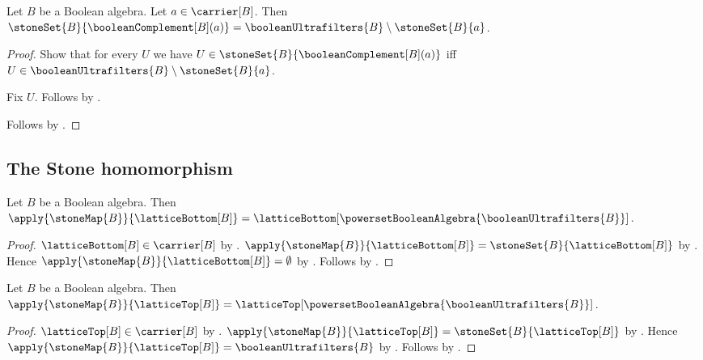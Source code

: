 \begin{proposition}\label{stone_set_complement}
    Let $B$ be a Boolean algebra.
    Let $a\in\carrier[B]$.
    Then $\stoneSet{B}{\booleanComplement[B](a)}=
        \booleanUltrafilters{B}\setminus\stoneSet{B}{a}$.
\end{proposition}
\begin{proof}
    Show that for every $U$ we have
        $U\in\stoneSet{B}{\booleanComplement[B](a)}$ iff
        $U\in\booleanUltrafilters{B}\setminus\stoneSet{B}{a}$.
    \begin{subproof}
        Fix $U$.
        Follows by
            .
    \end{subproof}
    Follows by .
\end{proof}

\subsection{The Stone homomorphism}

\begin{proposition}\label{stone_map_lattice_bottom}
    Let $B$ be a Boolean algebra.
    Then $\apply{\stoneMap{B}}{\latticeBottom[B]}=
        \latticeBottom[\powersetBooleanAlgebra{\booleanUltrafilters{B}}]$.
\end{proposition}
\begin{proof}
    $\latticeBottom[B]\in\carrier[B]$ by
        .
    $\apply{\stoneMap{B}}{\latticeBottom[B]}=
        \stoneSet{B}{\latticeBottom[B]}$ by .
    Hence $\apply{\stoneMap{B}}{\latticeBottom[B]}=\emptyset$ by
        .
    Follows by .
\end{proof}

\begin{proposition}\label{stone_map_lattice_top}
    Let $B$ be a Boolean algebra.
    Then $\apply{\stoneMap{B}}{\latticeTop[B]}=
        \latticeTop[\powersetBooleanAlgebra{\booleanUltrafilters{B}}]$.
\end{proposition}
\begin{proof}
    $\latticeTop[B]\in\carrier[B]$ by
        .
    $\apply{\stoneMap{B}}{\latticeTop[B]}=
        \stoneSet{B}{\latticeTop[B]}$ by .
    Hence $\apply{\stoneMap{B}}{\latticeTop[B]}=
        \booleanUltrafilters{B}$ by .
    Follows by .
\end{proof}


